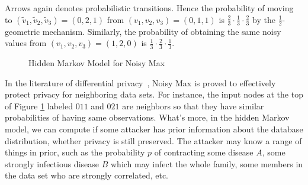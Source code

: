 Arrows again denotes probabilistic transitions. Hence the probability
of moving to $(\tilde{v}_1, \tilde{v}_2, \tilde{v}_3) = (0, 2, 1)$
from $(v_1, v_2, v_3) = (0, 1, 1)$ is $\frac{2}{3} \cdot \frac{1}{3}
\cdot \frac{2}{3}$ by the $\frac{1}{2}$-geometric
mechanism. Similarly, the probability of obtaining the same noisy
values from $(v_1, v_2, v_3) = (1, 2, 0)$ is $\frac{1}{3} \cdot
\frac{2}{3} \cdot \frac{1}{3}$.

\begin{figure}
  \centering
  \caption{Hidden Markov Model for Noisy Max}
  \label{figure:hmm-noisy-max}
\end{figure}

In the literature of differential privacy~\cite{DR:14:AFDP,DWWZK:18:DVDP},
Noisy Max is proved to effectively protect privacy for neighboring data sets. For instance, the input
nodes at the top of Figure \ref{figure:hmm-noisy-max} labeled $011$ and $021$ are neighbors
so that they have similar probabilities of having same observations. What's more,
in the hidden Markov model, we can compute if some attacker has prior information
about the database distribution, whether privacy is still preserved. The attacker may know
a range of things in prior, such as the probability $p$ of contracting some disease $A$,
some strongly infectious disease $B$ which may infect the whole family, some members in the
data set who are strongly correlated, etc.

